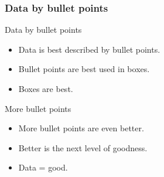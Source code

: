 \documentclass[11pt,xcolor=table]{beamer}
\begin{document}

\begin{frame}
\frametitle{Data by bullet points}
\begin{center}

\begin{block}{Data by bullet points}
\begin{itemize}
	\item Data is best described by bullet points.
	\item Bullet points are best used in boxes.
	\item Boxes are best.
\end{itemize}
\end{block}

\begin{exampleblock}{More bullet points}
\begin{itemize}
	\item More bullet points are even better.
	\item Better is the next level of goodness.
	\item Data = good.
\end{itemize}
\end{exampleblock}

\end{center}
\end{frame}

\end{document}
